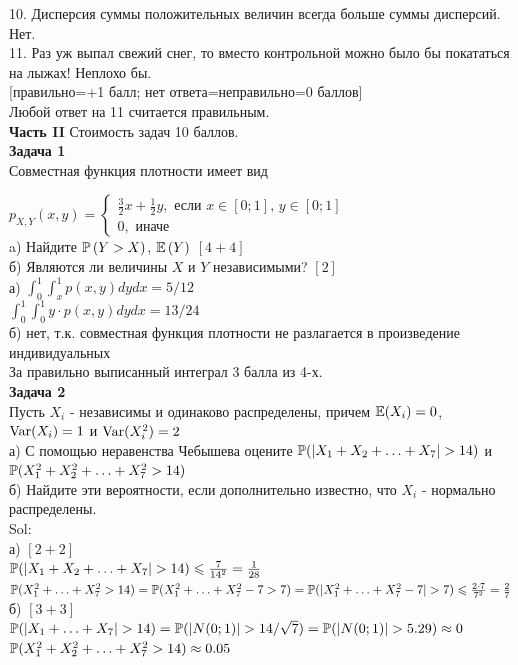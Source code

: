 \documentclass[12pt, a4paper]{article}\usepackage[]{graphicx}\usepackage[]{color}
\begin{document}
10. Дисперсия суммы положительных величин всегда больше суммы дисперсий. Нет. \\

11. Раз уж выпал свежий снег, то вместо контрольной можно
было бы покататься на лыжах! Неплохо бы. \\


$[$правильно=+1 балл; нет ответа=неправильно=0 баллов$]$ \\
Любой ответ на 11 считается правильным. \\


\textbf{Часть II} Стоимость задач 10 баллов. \\

\textbf{Задача 1} \\ %
Совместная функция плотности имеет вид

$p_{X,Y} \left(x,y\right)=
\left\{
\begin{array}{l}
{\frac{3}{2}x+\frac{1}{2}y, \text{ если } x\in \left[0;1\right],\, y\in \left[0;1\right]} \\
{0,\text{ иначе} }
\end{array}\right. $\\
a) Найдите  $\P\left(Y>X\right)$,  $\E\left(Y\right)$ $[4+4]$ \\
б) Являются ли величины $X$ и $Y$ независимыми? $[2]$ \\

а) $\int_{0}^{1}\int_{x}^{1}p(x,y)dydx=5/12$ \\
$\int_{0}^{1}\int_{0}^{1}y\cdot p(x,y)dydx=13/24$ \\
б) нет, т.к. совместная функция плотности не разлагается в произведение индивидуальных \\
За правильно выписанный интеграл 3 балла из 4-х. \\



\textbf{Задача 2} \\ %
Пусть $X_{i}$ - независимы и одинаково распределены, причем $\E(X_{i})=0$, $\Var(X_{i})=1$ и $\Var(X_{i}^{2})=2$ \\
а) С помощью неравенства Чебышева оцените $\P(|X_{1}+X_{2}+\ldots+X_{7}|>14)$ и $\P(X_{1}^{2}+X_{2}^{2}+\ldots+X_{7}^{2}>14)$ \\
б) Найдите эти вероятности, если дополнительно известно, что $X_{i}$ - нормально распределены. \\
Sol: \\
а) $[2+2]$ \\
$\P(|X_{1}+X_{2}+\ldots+X_{7}|>14)\leq \frac{7}{14^2}=\frac{1}{28}$ \\
$\P(X_{1}^{2}+\ldots+X_{7}^{2}>14)=\P(X_{1}^{2}+\ldots+X_{7}^{2}-7>7)=\P(|X_{1}^{2}+\ldots+X_{7}^{2}-7|>7)\leq \frac{2\cdot 7}{7^2}=\frac{2}{7}$ \\
б) $[3+3]$ \\
$\P(|X_{1}+\ldots+X_{7}|>14)=\P(|N(0;1)|>14/\sqrt{7})=\P(|N(0;1)|>5.29)\approx 0$ \\
$\P(X_{1}^{2}+X_{2}^{2}+\ldots+X_{7}^{2}>14)\approx 0.05$ \\
\end{document}
